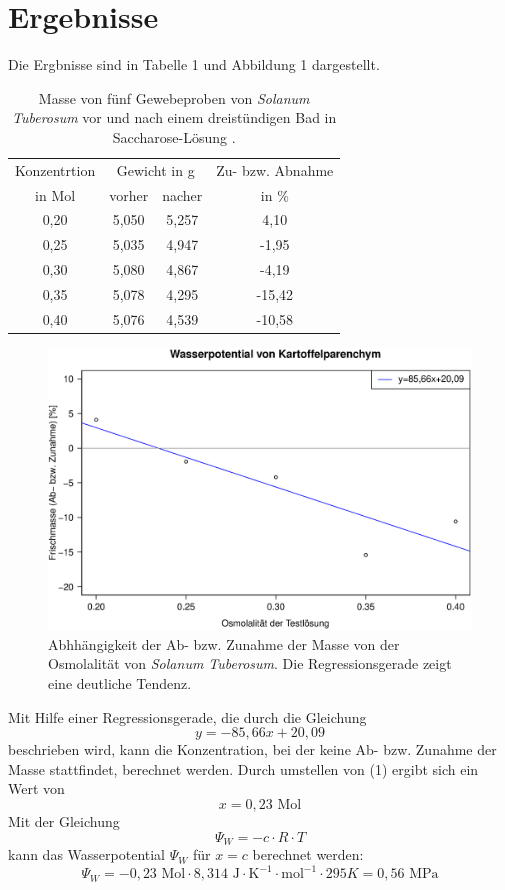 \documentclass[11pt,a4paper,DIV=10,]{scrartcl}
\begin{document}
\section*{Ergebnisse}
Die Ergbnisse sind in Tabelle 1 und Abbildung 1 dargestellt.
\begin{table}[H]
\caption{Masse von fünf Gewebeproben von \textit{Solanum Tuberosum} vor und nach einem dreistündigen Bad in Saccharose-Lösung .}
\label{tab1}
\center
\begin{tabular}{cccc}
\toprule
Konzentrtion &\multicolumn{2}{c}{Gewicht in g} & Zu- bzw. Abnahme \\
in Mol &vorher & nacher & in \%\\
\midrule
0,20 & 5,050 & 5,257 & 4,10 \\
0,25 & 5,035 & 4,947 & -1,95\\
0,30 & 5,080 & 4,867 & -4,19\\
0,35 & 5,078 & 4,295 & -15,42\\
0,40 & 5,076 & 4,539 & -10,58\\
\bottomrule
\end{tabular}
\end{table}
\begin{figure}[H]
\center
\captionsetup{width=1\textwidth}	
\includegraphics[width=1.0\textwidth]{Abbildungen/Rplot01}
\caption{Abhhängigkeit der Ab- bzw. Zunahme der Masse von der Osmolalität von \textit{Solanum Tuberosum}. Die Regressionsgerade zeigt eine deutliche Tendenz.}
\label{v1}
\end{figure}
\noindent
Mit Hilfe einer Regressionsgerade, die durch die Gleichung
\begin{equation}
y= -85,66x+20,09
\end{equation}
beschrieben wird, kann die Konzentration, bei der keine Ab- bzw. Zunahme der Masse stattfindet, berechnet werden. Durch umstellen von (1) ergibt sich ein Wert von
\begin{equation}
x=0,23 \textrm{~Mol}
\end{equation}
Mit der Gleichung
\begin{equation}
\Psi_W=-c\cdot R\cdot T
\end{equation}
kann das Wasserpotential $\Psi_W$ für $x=c$ berechnet werden:
\begin{equation}
\Psi_W=-0,23 \textrm{~Mol} \cdot 8,314 \textrm{~J}\cdot\textrm{K}^{-1}\cdot \textrm{mol}^{-1}\cdot 295 K=0,56 \textrm{~MPa}
 \end{equation}
\end{document}
